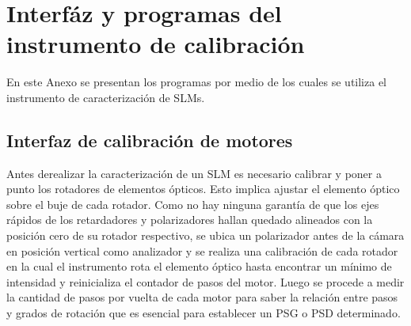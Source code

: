 
\chapter{Interfáz y programas del instrumento de calibración} %

\label{AppendixB} %


\graphicspath{{Figures/planos_piezas_rotador/}{../Figures/planos_piezas_rotador/}} 

En este Anexo se presentan los programas por medio de los cuales se
utiliza el instrumento de caracterización de SLMs. 
\section{Interfaz de calibración de motores}
Antes derealizar la caracterización de un SLM es necesario calibrar y poner a punto los
rotadores de elementos ópticos. Esto implica ajustar el elemento
óptico sobre el buje de cada rotador. Como no hay 
ninguna garantía de que los ejes rápidos de los retardadores y polarizadores hallan
quedado alineados con la posición cero de su rotador respectivo, se
ubica un polarizador antes de la cámara en posición vertical como
analizador y se realiza una
calibración de cada rotador en la cual el instrumento rota el elemento óptico hasta
encontrar un mínimo de intensidad y reinicializa el contador de pasos
del motor. Luego se procede a medir la cantidad de
pasos por vuelta de cada motor para saber la relación entre pasos y
grados de rotación que es esencial para establecer un PSG o PSD
determinado.

